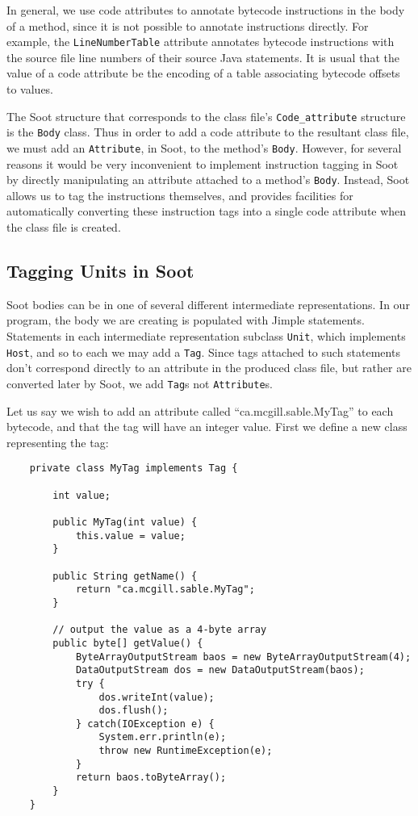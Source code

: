 \documentclass{article}
\begin{document}
In general, we use code attributes to annotate bytecode instructions in the 
body of a method, since it is not possible to annotate instructions directly. 
For example, the {\tt LineNumberTable} attribute annotates bytecode 
instructions with the source file line numbers of their source Java 
statements. It is usual that the value of a code attribute be the encoding of 
a table associating bytecode offsets to values.

The Soot structure that corresponds to the class file's {\tt Code\_attribute} 
structure is the {\tt Body} class. Thus in order to add a code attribute to 
the resultant class file, we must add an {\tt Attribute}, in Soot, to the 
method's {\tt Body}. However, for several reasons it would be very 
inconvenient to implement instruction tagging in Soot by directly manipulating 
an attribute attached to a method's {\tt Body}. Instead, Soot allows us to tag 
the instructions themselves, and provides facilities for automatically 
converting these instruction tags into a single code attribute when the class 
file is created.

\subsection{Tagging Units in Soot}

Soot bodies can be in one of several different intermediate representations. 
In our program, the body we are creating is populated with Jimple statements. 
Statements in each intermediate representation subclass {\tt Unit}, which 
implements {\tt Host}, and so to each we may add a {\tt Tag}. Since tags 
attached to such statements don't correspond directly to an attribute in the 
produced class file, but rather are converted later by Soot, we add {\tt Tag}s 
not {\tt Attribute}s.

Let us say we wish to add an attribute called ``ca.mcgill.sable.MyTag'' to each
bytecode, and that the tag will have an integer value. First we define a new
class representing the tag:

\begin{verbatim}
    private class MyTag implements Tag {

        int value;

        public MyTag(int value) {
            this.value = value;
        }

        public String getName() {
            return "ca.mcgill.sable.MyTag";
        }

        // output the value as a 4-byte array
        public byte[] getValue() {
            ByteArrayOutputStream baos = new ByteArrayOutputStream(4);
            DataOutputStream dos = new DataOutputStream(baos);
            try {
                dos.writeInt(value);
                dos.flush();
            } catch(IOException e) {
                System.err.println(e);
                throw new RuntimeException(e);
            }
            return baos.toByteArray();
        }
    }
\end{verbatim}
\end{document}
